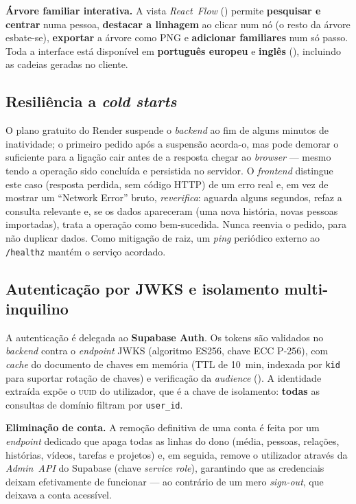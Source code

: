 \textbf{Árvore familiar interativa.} A vista \emph{React~Flow}
() permite \textbf{pesquisar e centrar} numa pessoa,
\textbf{destacar a linhagem} ao clicar num nó (o resto da árvore
esbate-se), \textbf{exportar} a árvore como PNG e \textbf{adicionar
familiares} num só passo. Toda a interface está disponível em
\textbf{português europeu} e \textbf{inglês} (), incluindo as
cadeias geradas no cliente.

\subsection{Resiliência a \emph{cold starts}}
\label{sub:coldstart}

O plano gratuito do Render suspende o \emph{backend} ao fim de alguns
minutos de inatividade; o primeiro pedido após a suspensão acorda-o, mas
pode demorar o suficiente para a ligação cair antes de a resposta chegar
ao \emph{browser} — mesmo tendo a operação sido concluída e persistida no
servidor. O \emph{frontend} distingue este caso (resposta perdida, sem
código HTTP) de um erro real e, em vez de mostrar um ``Network Error''
bruto, \emph{reverifica}: aguarda alguns segundos, refaz a consulta
relevante e, se os dados apareceram (uma nova história, novas pessoas
importadas), trata a operação como bem-sucedida. Nunca reenvia o pedido,
para não duplicar dados. Como mitigação de raiz, um \emph{ping} periódico
externo ao \texttt{/healthz} mantém o serviço acordado.
\label{sec:impl_seguranca}

\subsection{Autenticação por JWKS e isolamento multi-inquilino}

A autenticação é delegada ao \textbf{Supabase Auth}. Os tokens são
validados no \emph{backend} contra o \emph{endpoint} JWKS (algoritmo
ES256, chave ECC P-256), com \emph{cache} do documento de chaves em
memória (TTL de 10~min, indexada por \texttt{kid} para suportar rotação de
chaves) e verificação da \emph{audience} (). A identidade
extraída expõe o \textsc{uuid} do utilizador, que é a chave de isolamento:
\textbf{todas} as consultas de domínio filtram por \texttt{user\_id}.

\textbf{Eliminação de conta.} A remoção definitiva de uma conta é feita por um
\emph{endpoint} dedicado que apaga todas as linhas do dono (média, pessoas,
relações, histórias, vídeos, tarefas e projetos) e, em seguida, remove o
utilizador através da \emph{Admin~API} do Supabase (chave \emph{service role}),
garantindo que as credenciais deixam efetivamente de funcionar --- ao contrário
de um mero \emph{sign-out}, que deixava a conta acessível.

